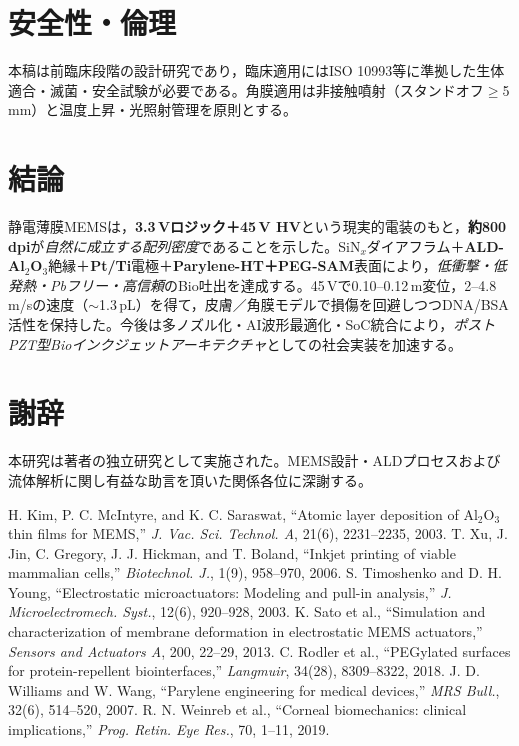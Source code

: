 \documentclass[conference]{IEEEtran}
\begin{document}
\section*{安全性・倫理}
本稿は前臨床段階の設計研究であり，臨床適用にはISO 10993等に準拠した生体適合・滅菌・安全試験が必要である。角膜適用は非接触噴射（スタンドオフ$\ge$5\,mm）と温度上昇・光照射管理を原則とする。

\section{結論}
静電薄膜MEMSは，\textbf{3.3\,Vロジック＋45\,V HV}という現実的電装のもと，\textbf{約800\,dpi}が\emph{自然に成立する配列密度}であることを示した。SiN$_x$ダイアフラム＋\textbf{ALD-Al$_2$O$_3$}絶縁＋\textbf{Pt/Ti}電極＋\textbf{Parylene-HT＋PEG-SAM}表面により，\emph{低衝撃・低発熱・Pbフリー・高信頼}のBio吐出を達成する。45\,Vで0.10--0.12\,\textmu m変位，2--4.8\,m/sの速度（$\sim$1.3\,pL）を得て，皮膚／角膜モデルで損傷を回避しつつDNA/BSA活性を保持した。今後は多ノズル化・AI波形最適化・SoC統合により，\emph{ポストPZT型Bioインクジェットアーキテクチャ}としての社会実装を加速する。

\section*{謝辞}
本研究は著者の独立研究として実施された。MEMS設計・ALDプロセスおよび流体解析に関し有益な助言を頂いた関係各位に深謝する。


\begin{thebibliography}{99}
 H. Kim, P. C. McIntyre, and K. C. Saraswat, ``Atomic layer deposition of Al$_2$O$_3$ thin films for MEMS,'' \emph{J. Vac. Sci. Technol. A}, 21(6), 2231--2235, 2003.
 T. Xu, J. Jin, C. Gregory, J. J. Hickman, and T. Boland, ``Inkjet printing of viable mammalian cells,'' \emph{Biotechnol. J.}, 1(9), 958--970, 2006.
 S. Timoshenko and D. H. Young, ``Electrostatic microactuators: Modeling and pull-in analysis,'' \emph{J. Microelectromech. Syst.}, 12(6), 920--928, 2003.
 K. Sato et al., ``Simulation and characterization of membrane deformation in electrostatic MEMS actuators,'' \emph{Sensors and Actuators A}, 200, 22--29, 2013.
 C. Rodler et al., ``PEGylated surfaces for protein-repellent biointerfaces,'' \emph{Langmuir}, 34(28), 8309--8322, 2018.
 J. D. Williams and W. Wang, ``Parylene engineering for medical devices,'' \emph{MRS Bull.}, 32(6), 514--520, 2007.
 R. N. Weinreb et al., ``Corneal biomechanics: clinical implications,'' \emph{Prog. Retin. Eye Res.}, 70, 1--11, 2019.
\end{thebibliography}

\balance
\end{document}
